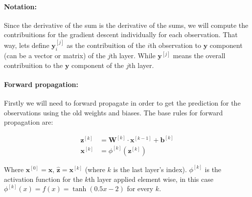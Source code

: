 \documentclass[12pt]{article}
\begin{document}
\begin{enumerate}[leftmargin=\labelsep]
    \paragraph{Notation:} Since the derivative of the sum is the derivative of the sums, we will compute the contribuitions for the gradient descent individually for each observation. That way, lets define $\mathbf{y}_i^{[j]}$ as the contribuition of the $i$th observation to $\mathbf{y}$ component (can be a vector or matrix) of the $j$th layer. While $\mathbf{y}^{[j]}$ means the overall contribuition to the $\mathbf{y}$ component of the $j$th layer.

    \paragraph{Forward propagation:} Firstly we will need to forward propagate in order to get the prediction for the observations using the old weights and biases.
    The base rules for forward propagation are:

    \begin{equation}
    \begin{split}
        \mathbf{z}^{[k]} &= \mathbf{W}^{[k]} \cdot \mathbf{x}^{[k-1]} + \mathbf{b}^{[k]} \\
        \mathbf{x}^{[k]} &= \phi^{[k]}(\mathbf{z}^{[k]})
    \end{split}
    \end{equation}

    Where $\mathbf{x}^{[0]} = \mathbf{x}$, $\hat{\mathbf{z}} = \mathbf{x}^{[k]}$ (where $k$ is the last layer's index). $\phi^{[k]}$ is the activation function for the $k$th layer applied element wise, in this case $\phi^{[k]}(x) = f(x) =\tanh(0.5x-2)$ for every $k$.


\end{enumerate}
\end{document}
